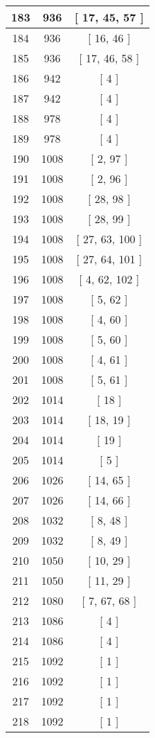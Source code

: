 \begin{center}
\begin{longtable}[H]{|| c c c ||}
\hline
183 & 936 & [ 17, 45, 57 ] \\ 
\hline
184 & 936 & [ 16, 46 ] \\ 
\hline
185 & 936 & [ 17, 46, 58 ] \\ 
\hline
186 & 942 & [ 4 ] \\ 
\hline
187 & 942 & [ 4 ] \\ 
\hline
188 & 978 & [ 4 ] \\ 
\hline
189 & 978 & [ 4 ] \\ 
\hline
190 & 1008 & [ 2, 97 ] \\ 
\hline
191 & 1008 & [ 2, 96 ] \\ 
\hline
192 & 1008 & [ 28, 98 ] \\ 
\hline
193 & 1008 & [ 28, 99 ] \\ 
\hline
194 & 1008 & [ 27, 63, 100 ] \\ 
\hline
195 & 1008 & [ 27, 64, 101 ] \\ 
\hline
196 & 1008 & [ 4, 62, 102 ] \\ 
\hline
197 & 1008 & [ 5, 62 ] \\ 
\hline
198 & 1008 & [ 4, 60 ] \\ 
\hline
199 & 1008 & [ 5, 60 ] \\ 
\hline
200 & 1008 & [ 4, 61 ] \\ 
\hline
201 & 1008 & [ 5, 61 ] \\ 
\hline
202 & 1014 & [ 18 ] \\ 
\hline
203 & 1014 & [ 18, 19 ] \\ 
\hline
204 & 1014 & [ 19 ] \\ 
\hline
205 & 1014 & [ 5 ] \\ 
\hline
206 & 1026 & [ 14, 65 ] \\ 
\hline
207 & 1026 & [ 14, 66 ] \\ 
\hline
208 & 1032 & [ 8, 48 ] \\ 
\hline
209 & 1032 & [ 8, 49 ] \\ 
\hline
210 & 1050 & [ 10, 29 ] \\ 
\hline
211 & 1050 & [ 11, 29 ] \\ 
\hline
212 & 1080 & [ 7, 67, 68 ] \\ 
\hline
213 & 1086 & [ 4 ] \\ 
\hline
214 & 1086 & [ 4 ] \\ 
\hline
215 & 1092 & [ 1 ] \\ 
\hline
216 & 1092 & [ 1 ] \\ 
\hline
217 & 1092 & [ 1 ] \\ 
\hline
218 & 1092 & [ 1 ] \\ 

\end{longtable}
\end{center}
